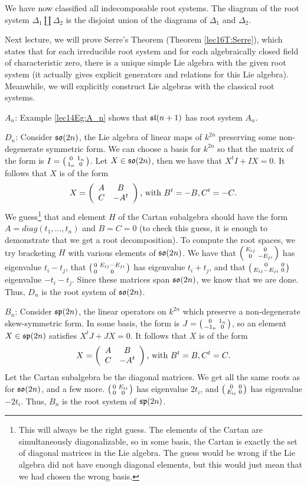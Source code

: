  We have now classified all indecomposable root systems. The diagram of the root
 system $\Delta_1\coprod \Delta_2$ is the disjoint union of the diagrams of $\Delta_1$
 and $\Delta_2$.


 Next lecture, we will prove Serre's Theorem (Theorem
 \ref{lec16T:Serre}), which states that for each irreducible
 root system and for each algebraically closed field of characteristic zero, there is
 a unique simple Lie algebra with the given root system (it actually gives
 explicit generators and relations for this Lie algebra). Meanwhile, we will
 explicitly construct Lie algebras with the classical root systems.

 \underline{$A_n$}: Example \ref{lec14Eg:A_n} shows that $\sl(n+1)$ has root system
 $A_n$.

 \underline{$D_n$}:
 Consider $\so(2n)$, the Lie algebra of linear maps of $k^{2n}$ preserving some
 non-degenerate symmetric form. We can choose a basis for $k^{2n}$ so that the matrix
 of the form is $I = \matrix 0{1_n}{1_n}0$. Let $X\in \so(2n)$, then we have that $X^t
 I+IX=0$. It follows that $X$ is of the form
 \[
    X = \mat{A & B\\ C& -A^t}\text{, with $B^t=-B, C^t=-C$.}
 \]
 We guess\footnote{This will always be the right guess. The elements of the Cartan are
 simultaneously diagonalizable, so in some basis, the Cartan is exactly the set of
 diagonal matrices in the Lie algebra. The guess would be wrong if the Lie algebra did
 not have enough diagonal elements, but this would just mean that we had chosen the
 wrong basis.} that and element $H$ of the Cartan subalgebra should have the form
 $A=diag(t_1,\dots, t_n)$ and $B=C=0$ (to check this guess, it is enough to
 demonstrate that we get a root decomposition). To compute the root spaces,
 we try bracketing $H$ with various elements of $\so(2n)$. We have that $\matrix
 {E_{ij}}00{-E_{ji}}$ has eigenvalue $t_i-t_j$, that $\matrix 0{E_{ij}-E_{ji}}00$ has
 eigenvalue $t_i+t_j$, and that $\matrix 00{E_{ij}-E_{ji}}0$ eigenvalue $-t_i-t_j$.
 Since these matrices span $\so(2n)$, we know that we are done. Thus, $D_n$ is the
 root system of $\so(2n)$.

 \underline{$B_n$}: Consider
 $\sp(2n)$, the linear operators on $k^{2n}$ which preserve a non-degenerate
 skew-symmetric form. In some basis, the form is $J = \matrix 0{1_n}{-1_n}0$, so an
 element $X\in \sp(2n)$ satisfies $X^tJ+JX=0$. It follows that $X$ is of the form
 \[
    X = \mat{A & B\\ C& -A^t}\text{, with $B^t=B, C^t=C$.}
 \]
 Let the Cartan subalgebra be the diagonal matrices. We get all the same roots as
 for $\so(2n)$, and a few more. $\matrix 0{E_{ii}}00$ has eigenvalue $2t_i$, and
 $\matrix 00{E_{ii}}0$ has eigenvalue $-2t_i$. Thus, $B_n$ is the root system of
 $\sp(2n)$.

